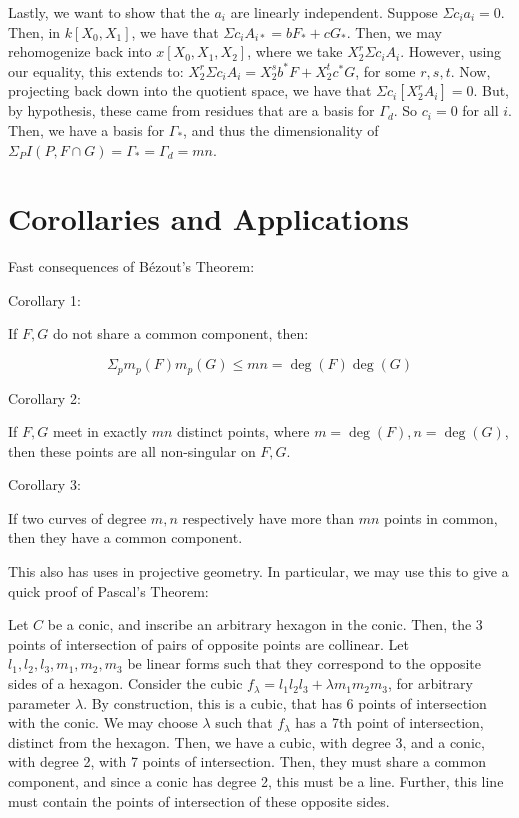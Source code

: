 \documentclass[10pt]{article}
\begin{document}
Lastly, we want to show that the $a_i$ are linearly independent. Suppose $\Sigma c_i a_i = 0$. Then, in $k[X_0,X_1]$, we have that $\Sigma c_i A_{i*} = b F_* + c G_*$. Then, we may rehomogenize back into $x[X_0,X_1,X_2]$, where we take $X_2^r \Sigma c_i A_{i}$. However, using our equality, this extends to: $X_2^r \Sigma c_i A_{i} = X_2^s b^* F + X_2^ t c^* G$, for some $r,s,t$. Now, projecting back down into the quotient space, we have that $\Sigma c_i [ X_2^rA_{i}] = 0$. But, by hypothesis, these came from residues that are a basis for $\Gamma_d$. So $c_i = 0$ for all $i$. Then, we have a basis for $\Gamma_*$, and thus the dimensionality of $\Sigma_P I(P,F \cap G) = \Gamma_* = \Gamma_d = mn$.

\section{Corollaries and Applications}

Fast consequences of B\'ezout's Theorem:

Corollary 1:

If $F,G$ do not share a common component, then:

$$ \Sigma_p m_p(F) m_p(G) \leq mn = \deg(F) \deg(G) $$

Corollary 2:

If $F,G$ meet in exactly $mn$ distinct points, where $m = \deg(F), n = \deg(G)$, then these points are all non-singular on $F,G$.

Corollary 3:

If two curves of degree $m,n$ respectively have more than $mn$ points in common, then they have a common component.

This also has uses in projective geometry. In particular, we may use this to give a quick proof of Pascal's Theorem:

Let $C$ be a conic, and inscribe an arbitrary hexagon in the conic. Then, the 3 points of intersection of pairs of opposite points are collinear. Let $l_1, l_2, l_3, m_1, m_2, m_3$ be linear forms such that they correspond to the opposite sides of a hexagon. Consider the cubic $f_\lambda = l_1 l_2 l_3 + \lambda m_1 m_2 m_3$, for arbitrary parameter $\lambda$. By construction, this is a cubic, that has 6 points of intersection with the conic. We may choose $\lambda$ such that $f_\lambda$ has a 7th point of intersection, distinct from the hexagon. Then, we have a cubic, with degree 3, and a conic, with degree 2, with 7 points of intersection. Then, they must share a common component, and since a conic has degree 2, this must be a line. Further, this line must contain the points of intersection of these opposite sides.
\end{document}

